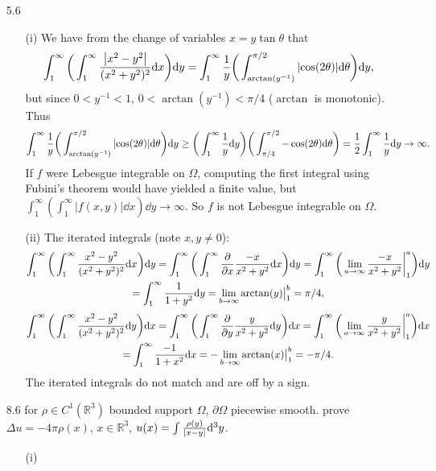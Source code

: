 \documentclass[11pt]{article}
\begin{document}
\begin{enumerate}
    \hrulefill
    \item[5.6] \begin{enumerate}
        \item[(i)] We have from the change of variables $x=y\tan \theta $ that 
        \[\int_1^\infty\bigg(\int_1^\infty \frac{\abs{x^2-y^2}}{(x^2+y^2)^2} \dd x\bigg)\dd y = \int_{1}^\infty \frac{1}{y} \bigg(\int_{\arctan(y^{-1})}^{\pi/2}\abs{\cos(2\theta)}\dd \theta\bigg) \dd y,\] but since $0<y^{-1}< 1$, $0 < \arctan(y^{-1}) < \pi/4$ ($\arctan$ is monotonic). Thus 
        \[\int_{1}^\infty \frac{1}{y} \bigg(\int_{\arctan(y^{-1})}^{\pi/2}\abs{\cos(2\theta)}\dd \theta\bigg) \dd y\geq \bigg(\int_{1}^\infty \frac{1}{y} \dd y\bigg)\bigg(\int_{\pi/4}^{\pi/2}-\cos(2\theta)\dd \theta\bigg) = \frac{1}{2}\int_1^\infty \frac{1}{y}\dd y \to \infty.\] If $f$ were Lebesgue integrable on $\Omega$, computing the first integral using Fubini's theorem would have yielded a finite value, but $\int_1^\infty (\int_1^\infty |f(x,y)|\dd x) \dd y \to \infty$. So $f$ is not Lebesgue integrable on $\Omega$.
        \item[(ii)] The iterated integrals (note $x,y\neq 0$): 
        \begin{multline*}
            \int_1^\infty\bigg(\int_1^\infty \frac{x^2-y^2}{(x^2+y^2)^2} \dd x\bigg)\dd y = \int_1^\infty\bigg(\int_1^\infty \pdv{x}\frac{-x}{x^2+y^2} \dd x\bigg)\dd y = \int_1^\infty\bigg(\lim_{a\to\infty} \frac{-x}{x^2+y^2}\bigg|_{1}^a \bigg)\dd y \\
            = \int_1^\infty \frac{1}{1+y^2}\dd y = \lim_{b\to\infty} \arctan(y)\big|_{1}^b = \pi/4,
        \end{multline*}\begin{multline*}
            \int_1^\infty\bigg(\int_1^\infty \frac{x^2-y^2}{(x^2+y^2)^2} \dd y\bigg)\dd x = \int_1^\infty\bigg(\int_1^\infty \pdv{y}\frac{y}{x^2+y^2} \dd y\bigg)\dd x = \int_1^\infty\bigg(\lim_{a\to\infty} \frac{y}{x^2+y^2}\bigg|_{1}^a\bigg)\dd x \\
            = \int_1^\infty \frac{-1}{1+x^2}\dd x = -\lim_{b\to\infty} \arctan(x)\big|_{1}^b = -\pi/4.
        \end{multline*}
        The iterated integrals do not match and are off by a sign.
    \end{enumerate}
    \hrulefill
    \item[8.6] for $\rho\in C^1(\mathbb R^3)$ bounded support $\Omega$, $\partial \Omega$ piecewise smooth. prove $\Delta u = -4\pi \rho(x)$, $x\in \mathbb{R}^3$, $u(x) = \int\frac{\rho(y)}{\abs{x-y}}\dd^3y$. 
    \begin{enumerate}
        \item[(i)] %
        

\end{enumerate}
\end{enumerate}
\end{document}
